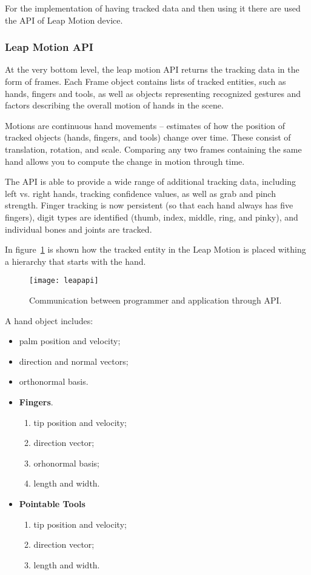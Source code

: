 {For the implementation of having tracked data and then using it there are used the API of Leap Motion device.

\subsubsection{Leap Motion API}
At the very bottom level, the leap motion API returns the tracking data in the form of frames. Each Frame object contains lists of tracked entities, such as hands, fingers and tools, as well as objects representing recognized gestures and factors describing the overall motion of hands in the scene.

Motions are continuous hand movements – estimates of how the position of tracked objects (hands, fingers, and tools) change over time. These consist of translation, rotation, and scale. Comparing any two frames containing the same hand allows you to compute the change in motion through time.

The API is able to provide a wide range of additional tracking data, including left vs. right hands, tracking confidence values, as well as grab and pinch strength. Finger tracking is now persistent (so that each hand always has five fingers), digit types are identified (thumb, index, middle, ring, and pinky), and individual bones and joints are tracked.

In \mbox{figure \ref{leapapi}} is shown how the tracked entity in the Leap Motion is placed withing a hierarchy that starts with the hand. 

\begin{figure}[!h]
\centering
\texttt{[image: leapapi]}
\caption{Communication between programmer and application through API. \cite{leapapi}}\label{leapapi}
\end{figure}

A hand object includes: 
\begin{itemize}
\item palm position and velocity;
\item direction and normal vectors;
\item orthonormal basis.
\item \textbf{Fingers}. 
\begin{enumerate}
\item tip position and velocity;
\item direction vector;
\item orhonormal basis;
\item length and width.
\end{enumerate}
\item \textbf{Pointable Tools}
\begin{enumerate}
\item tip position and velocity;
\item direction vector;
\item length and width.
\end{enumerate}
\end{itemize}

}
